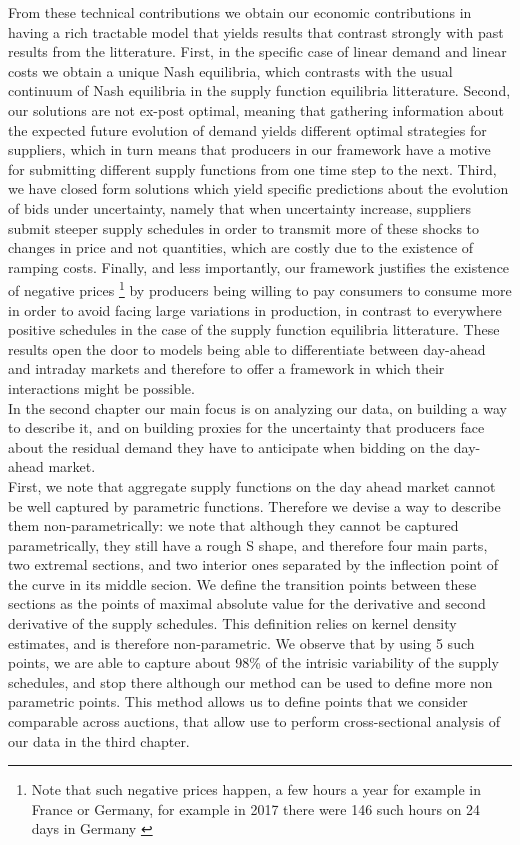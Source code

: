 From these technical contributions we obtain our economic contributions in having a rich tractable model that yields results that contrast strongly with past results from the litterature. First, in the specific case of linear demand and linear costs we obtain a unique Nash equilibria, which contrasts with the usual continuum of Nash equilibria in the supply function equilibria litterature. Second, our solutions are not ex-post optimal, meaning that gathering information about the expected future evolution of demand yields different optimal strategies for suppliers, which in turn means that producers in our framework have a motive for submitting different supply functions from one time step to the next. Third, we have closed form solutions which yield specific predictions about the evolution of bids under uncertainty, namely that when uncertainty increase, suppliers submit steeper supply schedules in order to transmit more of these shocks to changes in price and not quantities, which are costly due to the existence of ramping costs. Finally, and less importantly, our framework justifies the existence of negative prices \footnote{Note that such negative prices happen, a few hours a year for example in France or Germany, for example in 2017 there were 146 such hours on 24 days in Germany \cite{epexnegP}} by producers being willing to pay consumers to consume more in order to avoid facing large variations in production, in contrast to everywhere positive schedules in the case of the supply function equilibria litterature. These results open the door to models being able to differentiate between day-ahead and intraday markets and therefore to offer a framework in which their interactions might be possible.\\

In the second chapter our main focus is on analyzing our data, on building a way to describe it, and on building proxies for the uncertainty that producers face about the residual demand they have to anticipate when bidding on the day-ahead market. \\

First, we note that aggregate supply functions on the day ahead market cannot be well captured by parametric functions. Therefore we devise a way to describe them non-parametrically: we note that although they cannot be captured parametrically, they still have a rough S shape, and therefore four main parts, two extremal sections, and two interior ones separated by the inflection point of the curve in its middle secion. We define the transition points between these sections as the points of maximal absolute value for the derivative and second derivative of the supply schedules. This definition relies on kernel density estimates, and is therefore non-parametric. We observe that by using 5 such points, we are able to capture about 98\% of the intrisic variability of the supply schedules, and stop there although our method can be used to define more non parametric points. This method allows us to define points that we consider comparable across auctions, that allow use to perform cross-sectional analysis of our data in the third chapter. \\


